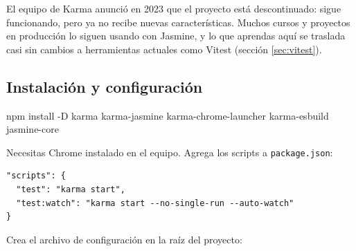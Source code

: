 \documentclass[11pt,a4paper]{article}
\newcommand{\cmd}[1]{\texttt{\color{reactdark}#1}}
\begin{document}
\begin{center}
\end{center}

\begin{atencion}
El equipo de Karma anunció en 2023 que el proyecto está descontinuado: sigue funcionando, pero ya no recibe nuevas características. Muchos cursos y proyectos en producción lo siguen usando con Jasmine, y lo que aprendas aquí se traslada casi sin cambios a herramientas actuales como Vitest (sección \ref{sec:vitest}).
\end{atencion}

\subsection{Instalación y configuración}

\begin{terminal}
npm install -D karma karma-jasmine karma-chrome-launcher karma-esbuild jasmine-core
\end{terminal}

Necesitas Chrome instalado en el equipo. Agrega los scripts a \cmd{package.json}:
\begin{lstlisting}[language=JSX,numbers=none]
"scripts": {
  "test": "karma start",
  "test:watch": "karma start --no-single-run --auto-watch"
}
\end{lstlisting}

Crea el archivo de configuración en la raíz del proyecto:
\end{document}
